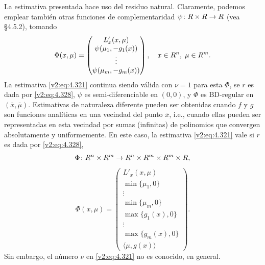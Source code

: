 La estimativa presentada hace uso del residuo natural. Claramente, podemos emplear también otras funciones de complementaridad $\psi \colon R \times R \to R$ (vea \S 4.5.2), tomando
\[
    \Phi(x, \mu) = \begin{pmatrix} L'_x(x, \mu) \\ \psi(\mu_1, -g_1(x)) \\ \vdots \\ \psi(\mu_m, -g_m(x)) \end{pmatrix}, \quad x \in R^n, \; \mu \in R^m.
\]
La estimativa \eqref{v2:eq:4.321} continua siendo válida con $\nu = 1$ para esta $\Phi$, se $r$ es dada por \eqref{v2:eq:4.328}, $\psi$ es semi-diferenciable en $(0, 0)$, y $\Phi$ es BD-regular en $(\bar{x}, \bar{\mu})$.
Estimativas de naturaleza diferente pueden ser obtenidas cuando $f$ y $g$ son funciones analíticas en una vecindad del punto $\bar{x}$, i.e., cuando ellas pueden ser representadas en esta vecindad por sumas (infinitas) de polinomios que convergen absolutamente y uniformemente. En este caso, la estimativa \eqref{v2:eq:4.321} vale si $r$ es dada por \eqref{v2:eq:4.328},
\[
    \Phi \colon R^n \times R^m \to R^n \times R^m \times R^m \times R,
\]
\[
    \Phi(x, \mu) = \begin{pmatrix} L'_x(x, \mu) \\ \min\{\mu_1, 0\} \\ \vdots \\ \min\{\mu_m, 0\} \\ \max\{g_1(x), 0\} \\ \vdots \\ \max\{g_m(x), 0\} \\ \langle \mu, g(x) \rangle \end{pmatrix}.
\]
Sin embargo, el número $\nu$ en \eqref{v2:eq:4.321} no es conocido, en general.

